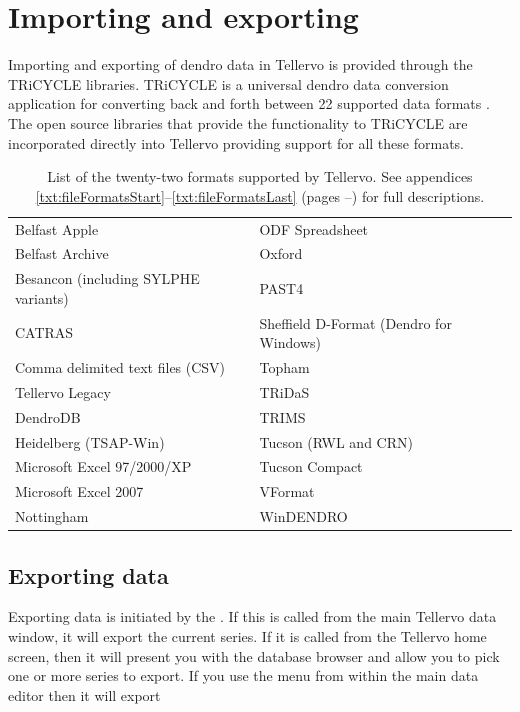 \chapter{Importing and exporting}
\label{txt:importExport}
Importing and exporting of dendro data in Tellervo is provided through the TRiCYCLE libraries.  TRiCYCLE is a universal dendro data conversion application for converting back and forth between 22 supported data formats \citep{tricycle}.  The open source libraries that provide the functionality to TRiCYCLE are incorporated directly into Tellervo providing support for all these formats.  

\begin{table}[htbp]
\centering
\label{txt:formatList}
\begin{tabular*}{0.8\textwidth}{ll}
\toprule
Belfast Apple & ODF Spreadsheet \\
Belfast Archive & Oxford \\
Besancon (including SYLPHE variants) &   PAST4\\
CATRAS & Sheffield D-Format (Dendro for Windows)\\
Comma delimited text files (CSV) &  Topham \\
Tellervo Legacy &  TRiDaS\\
DendroDB & TRIMS\\
Heidelberg (TSAP-Win) &  Tucson (RWL and CRN)\\
Microsoft Excel 97/2000/XP& Tucson Compact\\
Microsoft Excel 2007 & VFormat\\
Nottingham &  WinDENDRO\\
\bottomrule
\end{tabular*}
\caption{List of the twenty-two formats supported by Tellervo. See appendices \ref{txt:fileFormatsStart}--\ref{txt:fileFormatsLast} (pages \pageref{txt:fileFormatsStart}--\pageref{txt:fileFormatsEnd}) for full descriptions.}
\end{table}



\section{Exporting data}
Exporting data is initiated by the .  If this is called from the main Tellervo data window, it will export the current series.  If it is called from the Tellervo home screen, then it will present you with the database browser and allow you to pick one or more series to export.  If you use the menu from within the main data editor then it will export 

